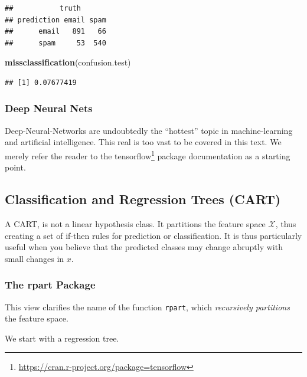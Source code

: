 \documentclass[]{book}
\newenvironment{Shaded}{\begin{snugshade}}{\end{snugshade}}
\newcommand{\CommentTok}[1]{\textcolor[rgb]{0.56,0.35,0.01}{\textit{#1}}}
\newcommand{\DataTypeTok}[1]{\textcolor[rgb]{0.13,0.29,0.53}{#1}}
\newcommand{\FloatTok}[1]{\textcolor[rgb]{0.00,0.00,0.81}{#1}}
\newcommand{\KeywordTok}[1]{\textcolor[rgb]{0.13,0.29,0.53}{\textbf{#1}}}
\newcommand{\NormalTok}[1]{#1}
\newcommand{\OperatorTok}[1]{\textcolor[rgb]{0.81,0.36,0.00}{\textbf{#1}}}
\newcommand{\StringTok}[1]{\textcolor[rgb]{0.31,0.60,0.02}{#1}}
\renewcommand{\href}[2]{#2\footnote{\url{#1}}}
\theoremstyle{definition}
\theoremstyle{definition}
\theoremstyle{definition}
\theoremstyle{remark}
\begin{document}
\begin{verbatim}
##           truth
## prediction email spam
##      email   891   66
##      spam     53  540
\end{verbatim}

\begin{Shaded}
\begin{Highlighting}[]
\KeywordTok{missclassification}\NormalTok{(confusion.test)}
\end{Highlighting}
\end{Shaded}

\begin{verbatim}
## [1] 0.07677419
\end{verbatim}

\hypertarget{deep-neural-nets}{%
\subsubsection{Deep Neural Nets}\label{deep-neural-nets}}

Deep-Neural-Networks are undoubtedly the ``hottest'' topic in machine-learning and artificial intelligence.
This real is too vast to be covered in this text.
We merely refer the reader to the \href{https://cran.r-project.org/package=tensorflow}{tensorflow} package documentation as a starting point.

\hypertarget{trees}{%
\subsection{Classification and Regression Trees (CART)}\label{trees}}

A CART, is not a linear hypothesis class.
It partitions the feature space \(\mathcal{X}\), thus creating a set of if-then rules for prediction or classification.
It is thus particularly useful when you believe that the predicted classes may change abruptly with small changes in \(x\).

\hypertarget{rpart}{%
\subsubsection{The rpart Package}\label{rpart}}

This view clarifies the name of the function \texttt{rpart}, which \emph{recursively partitions} the feature space.

We start with a regression tree.

\begin{Shaded}
\end{Shaded}
\end{document}
